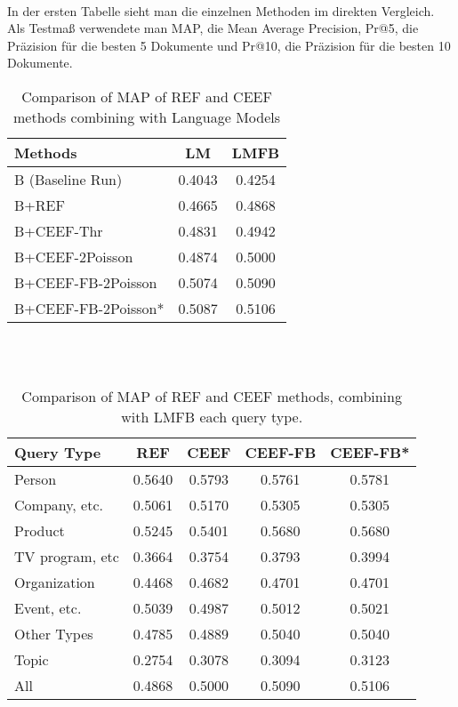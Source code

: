 \\
In der ersten Tabelle sieht man die einzelnen Methoden im direkten Vergleich. Als Testmaß verwendete man MAP, die Mean Average Precision, Pr@5, die Präzision für die besten 5 Dokumente und Pr@10, die Präzision für die besten 10 Dokumente.



\begin{table}[h]
	\centering
	\begin{tabular}{lS[tabnumalign=centre,tabformat=1.4,decimalsymbol=comma]S[tabnumalign=centre,tabformat=1.4,decimalsymbol=comma]}
		\toprule
		Methods & {LM} & {LMFB} \\
		\midrule
		B (Baseline Run) & 0.4043 & 0.4254 \\
		B+REF & 0.4665 & 0.4868 \\
		B+CEEF-Thr & 0.4831 & 0.4942 \\
		B+CEEF-2Poisson & 0.4874 & 0.5000 \\
		B+CEEF-FB-2Poisson & 0.5074 & 0.5090 \\
		B+CEEF-FB-2Poisson* & 0.5087 & 0.5106 \\
		\bottomrule
	\end{tabular}
	\caption{Comparison of MAP of REF and CEEF methods combining with Language Models}
	\cite{paper:Na}
\end{table}\\
\\




\begin{table}[h]
	\centering
		\begin{tabular}{lS[tabnumalign=centre,tabformat=1.4,decimalsymbol=comma]S[tabnumalign=centre,tabformat=1.4,decimalsymbol=comma]S[tabnumalign=centre,tabformat=1.4,decimalsymbol=comma]S[tabnumalign=centre,tabformat=1.4,decimalsymbol=comma]}
			\toprule
			Query Type & {REF} & {CEEF} & {CEEF-FB} & {CEEF-FB*}\\
			\midrule
			Person & 0.5640 & 0.5793 & 0.5761 & 0.5781\\
			Company, etc. & 0.5061 & 0.5170 & 0.5305 & 0.5305\\
			Product & 0.5245 & 0.5401 & 0.5680 & 0.5680\\
			TV program, etc & 0.3664 & 0.3754 & 0.3793 & 0.3994\\
			Organization & 0.4468 & 0.4682 & 0.4701 & 0.4701\\
			Event, etc. & 0.5039 & 0.4987 & 0.5012 & 0.5021\\
			Other Types & 0.4785 & 0.4889 & 0.5040 & 0.5040\\
			Topic & 0.2754 & 0.3078 & 0.3094 & 0.3123\\
			All & 0.4868 & 0.5000 & 0.5090 & 0.5106\\
			\bottomrule
		\end{tabular}
		\caption{Comparison of MAP of REF and CEEF methods, combining with LMFB each query type.\cite{paper:Na}}
\end{table}\\
\\








